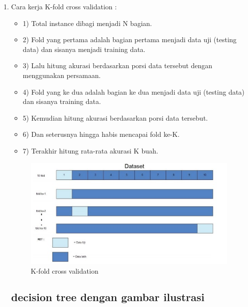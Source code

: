 \begin{enumerate}
\item Cara kerja K-fold cross validation :
\begin{itemize}
\item 1) Total instance dibagi menjadi N bagian.
\item 2) Fold yang pertama adalah bagian pertama menjadi data uji (testing data) dan sisanya menjadi training data.
\item 3) Lalu hitung akurasi berdasarkan porsi data tersebut dengan menggunakan persamaan.
\item 4) Fold yang ke dua adalah bagian ke dua menjadi data uji (testing data) dan sisanya training data. 
\item 5) Kemudian hitung akurasi berdasarkan porsi data tersebut.
\item 6) Dan seterusnya hingga habis mencapai fold ke-K.
\item 7) Terakhir hitung rata-rata akurasi K buah.
\end{itemize}
\begin{figure}[ht]
\centering
\includegraphics[scale=0.5]{figures/f5.jpg}
\caption{K-fold cross validation }
\label{contoh}
\end{figure}

\subsection{decision tree dengan gambar ilustrasi}


\end{enumerate}
